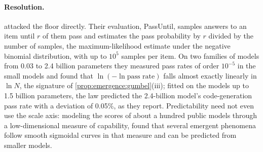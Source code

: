 \begin{refsection}
\paragraph{Resolution.} \Textcite{HuEtAl2024} attacked the floor directly. Their evaluation, PassUntil, samples answers to an item until $r$ of them pass and estimates the pass probability by $r$ divided by the number of samples, the maximum-likelihood estimate under the negative binomial distribution, with up to $10^5$ samples per item. On two families of models from 0.03 to 2.4 billion parameters they measured pass rates of order $10^{-5}$ in the small models and found that $\ln(-\ln\text{pass rate})$ falls almost exactly linearly in $\ln N$, the signature of \cref{prop:emergence:gumbel}(iii); fitted on the models up to 1.5 billion parameters, the law predicted the 2.4-billion model's code-generation pass rate with a deviation of 0.05\%, as they report. Predictability need not even use the scale axis: modeling the scores of about a hundred public models through a low-dimensional measure of capability, \textcite{RuanMaddisonHashimoto2024} found that several emergent phenomena follow smooth sigmoidal curves in that measure and can be predicted from smaller models.


\end{refsection}
